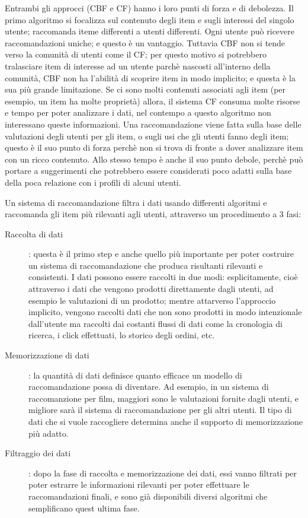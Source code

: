 Entrambi gli approcci (CBF e CF) hanno i loro punti di forza e di debolezza. Il primo algoritmo si focalizza sul contenuto degli item e
sugli interessi del singolo utente; raccomanda iteme differenti a utenti differenti. Ogni utente può ricevere raccomandazioni uniche; e 
questo è un vantaggio. Tuttavia CBF non si tende verso la comunità di utenti come il CF; per questo motivo si potrebbero tralasciare 
item di interesse ad un utente parchè nascosti all'interno della comunità, CBF non ha l'abilità di scoprire item in modo implicito; e 
questa è la sua più grande limitazione.
Se ci sono molti contenuti associati agli item (per esempio, un item ha molte proprietà) allora, il sistema CF consuma molte risorse e 
tempo per poter analizzare i dati, nel contempo a questo algoritmo non interessano queste informazioni. Una raccomandazione viene fatta
sulla base delle valutazioni degli utenti per gli item, o sugli usi che gli utenti fanno degli item; questo è il suo punto di forza 
perchè non si trova di fronte a dover analizzare item con un ricco contenuto. Allo stesso tempo è anche il suo punto debole, perchè può
portare a suggerimenti che potrebbero essere considerati poco adatti sulla base della poca relazione con i profili di alcuni utenti.
\cite{model-based-approach-for-collaborative-filtering}

Un sistema di raccomandazione filtra i dati usando differenti algoritmi e raccomanda gli item più rilevanti agli utenti,
attraverso un procedimento a 3 fasi:

\begin{description}
	\item[Raccolta di dati]: questa è il primo step e anche quello più importante per poter costruire un sistema di 
	raccomandazione che produca risultanti rilevanti e consistenti. I dati possono essere raccolti in due modi: esplicitamente,
	cioè attraverso i dati che vengono prodotti direttamente dagli utenti, ad esempio le valutazioni di un prodotto; mentre 
	attarverso l'approccio implicito, vengono raccolti dati che non sono prodotti in modo intenzionale dall'utente ma raccolti
	dai costanti flussi di dati come la cronologia di ricerca, i click effettuati, lo storico degli ordini, etc.
	\item[Memorizzazione di dati]: la quantità di dati definisce quanto efficace un modello di raccomandazione possa di
	diventare. Ad esempio, in un sistema di raccomanzione per film, maggiori sono le valutazioni fornite dagli utenti, e 
	migliore sarà il sistema di raccomandazione per gli altri utenti. Il tipo di dati che si vuole raccogliere determina
	anche il supporto di memorizzazione più adatto.   
	\item[Filtraggio dei dati]: dopo la fase di raccolta e memorizzazione dei dati, essi vanno filtrati per poter estrarre
	le informazioni rilevanti per poter effettuare le raccomandazioni finali, e sono già disponibili diversi algoritmi che
	semplificano quest ultima fase. 
\end{description}

